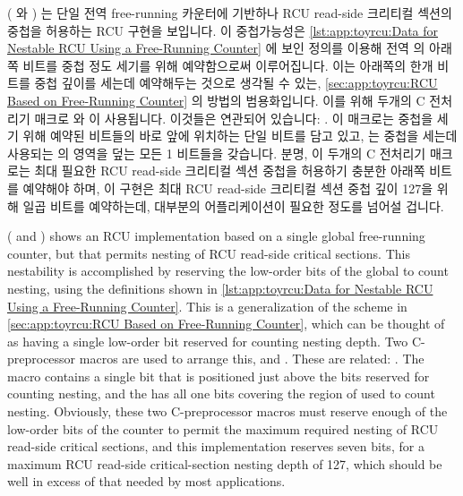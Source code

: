 ( 와 )
는 단일 전역 free-running 카운터에 기반하나 RCU read-side 크리티컬 섹션의
중첩을 허용하는 RCU 구현을 보입니다.
이 중첩가능성은
\cref{lst:app:toyrcu:Data for Nestable RCU Using a Free-Running Counter}
에 보인 정의를 이용해 전역  의 아래쪽 비트를 중첩 정도 세기를
위해 예약함으로써 이루어집니다.
이는
아래쪽의 한개 비트를 중첩 깊이를 세는데 예약해두는 것으로 생각될 수 있는,
\cref{sec:app:toyrcu:RCU Based on Free-Running Counter}
의 방법의 범용화입니다.
이를 위해 두개의 C 전처리기 매크로  와
 이 사용됩니다.
이것들은 연관되어 있습니다: .
이  매크로는 중첩을 세기 위해 예약된 비트들의 바로
앞에 위치하는 단일 비트를 담고 있고,  는 중첩을 세는데
사용되는  의 영역을 덮는 모든 1 비트들을 갖습니다.
분명, 이 두개의 C 전처리기 매크로는 최대 필요한 RCU read-side 크리티컬 섹션
중첩을 허용하기 충분한 아래쪽 비트를 예약해야 하며, 이 구현은 최대 RCU
read-side 크리티컬 섹션 중첩 깊이 127을 위해 일곱 비트를 예약하는데, 대부분의
어플리케이션이 필요한 정도를 넘어설 겁니다.

\iffalse

( and )
shows an RCU implementation based on a single global free-running counter,
but that permits nesting of RCU read-side critical sections.
This nestability is accomplished by reserving the low-order bits of the
global  to count nesting, using the definitions shown in
\cref{lst:app:toyrcu:Data for Nestable RCU Using a Free-Running Counter}.
This is a generalization of the scheme in
\cref{sec:app:toyrcu:RCU Based on Free-Running Counter},
which can be thought of as having a single low-order bit reserved
for counting nesting depth.
Two C-preprocessor macros are used to arrange this,
 and
.
These are related: .
The  macro contains a single bit that is
positioned just above the bits reserved for counting nesting,
and the  has all one bits covering the
region of  used to count nesting.
Obviously, these two C-preprocessor macros must reserve enough
of the low-order bits of the counter to permit the maximum required
nesting of RCU read-side critical sections, and this implementation
reserves seven bits, for a maximum RCU read-side critical-section
nesting depth of 127, which should be well in excess of that needed
by most applications.

